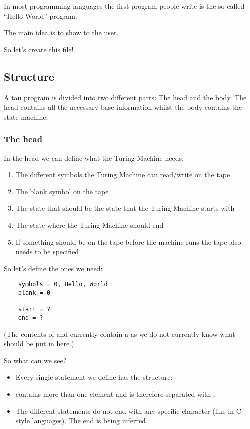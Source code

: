 In most programming languages the first program people write is the so called ``Hello World'' program.

The main idea is to show  to the user.

\vspace{0.5em}

So let's create this  file!

\subsection{Structure}
A tau program is divided into two different parts: The head and the body. 
The head contains all the necessary base information whilst the body contains the state machine.

\subsubsection{The head}
In the head we can define what the Turing Machine needs:
\begin{enumerate}
    \item The different symbols the Turing Machine can read/write on the tape
    \item The blank symbol on the tape
    \item The state that should be the state that the Turing Machine starts with
    \item The state where the Turing Machine should end
    \item If something should be on the tape before the machine runs the tape also needs to be specified
\end{enumerate}

So let's define the ones we need:
\begin{verbatim}
    symbols = 0, Hello, World
    blank = 0

    start = ?
    end = ?
\end{verbatim}

(The contents of  and  currently contain a  as we do not currently know what should be put in here.)

So what can we see?

\begin{itemize}
    \item Every single statement we define has the structure: 
    \begin{center}
    \end{center}
    \item {} contains more than one element and is therefore separated with \code{,}.
    \item The different statements do not end with any specific character (like \code{;} in C-style languages).
          The end is being inferred.
\end{itemize}

